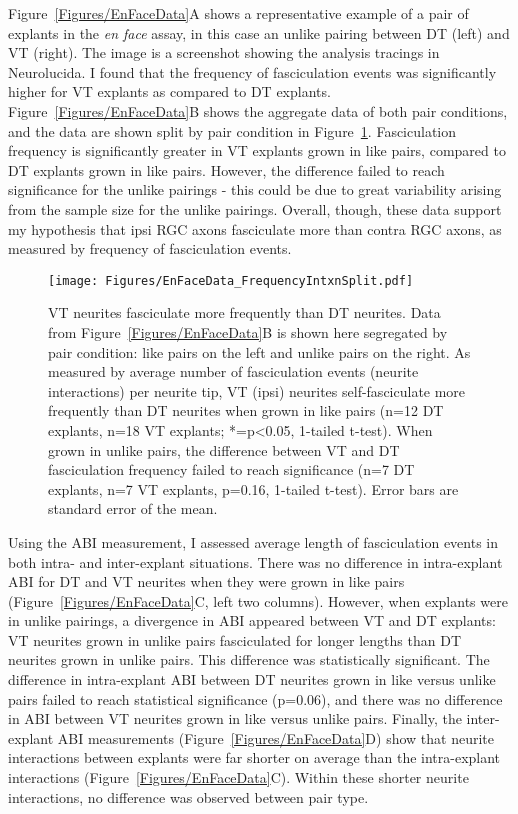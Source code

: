 Figure~\ref{Figures/EnFaceData}A shows a representative example of a pair of explants in the \emph{en face} assay, in this case an unlike pairing between DT (left) and VT (right).
The image is a screenshot showing the analysis tracings in Neurolucida.
I found that the frequency of fasciculation events was significantly higher for VT explants as compared to DT explants.
Figure~\ref{Figures/EnFaceData}B shows the aggregate data of both pair conditions, and the data are shown split by pair condition in Figure~\ref{Figures/EnFaceData_FrequencyIntxnSplit}.
Fasciculation frequency is significantly greater in VT explants grown in like pairs, compared to DT explants grown in like pairs.
However, the difference failed to reach significance for the unlike pairings - this could be due to great variability arising from the sample size for the unlike pairings.
Overall, though, these data support my hypothesis that ipsi RGC axons fasciculate more than contra RGC axons, as measured by frequency of fasciculation events.
\begin{figure}[hbtp]
    \begin{center}
        \texttt{[image: Figures/EnFaceData\_FrequencyIntxnSplit.pdf]}
        \caption[VT neurites fasciculate more frequently than DT neurites.]
        {
		VT neurites fasciculate more frequently than DT neurites.
		Data from Figure~\ref{Figures/EnFaceData}B is shown here segregated by pair condition: like pairs on the left and unlike pairs on the right.
		As measured by average number of fasciculation events (neurite interactions) per neurite tip, VT (ipsi) neurites self-fasciculate more frequently than DT neurites when grown in like pairs (n=12 DT explants, n=18 VT explants; *=p<0.05, 1-tailed t-test).
		When grown in unlike pairs, the difference between VT and DT fasciculation frequency failed to reach significance (n=7 DT explants, n=7 VT explants, p=0.16, 1-tailed t-test).
		Error bars are standard error of the mean.
		}
        \label{Figures/EnFaceData_FrequencyIntxnSplit}
    \end{center}
\end{figure}

Using the ABI measurement, I assessed average length of fasciculation events in both intra- and inter-explant situations.
There was no difference in intra-explant ABI for DT and VT neurites when they were grown in like pairs (Figure~\ref{Figures/EnFaceData}C, left two columns).
However, when explants were in unlike pairings, a divergence in ABI appeared between VT and DT explants: VT neurites grown in unlike pairs fasciculated for longer lengths than DT neurites grown in unlike pairs.
This difference was statistically significant.
The difference in intra-explant ABI between DT neurites grown in like versus unlike pairs failed to reach statistical significance (p=0.06), and there was no difference in ABI between VT neurites grown in like versus unlike pairs.
Finally, the inter-explant ABI measurements (Figure~\ref{Figures/EnFaceData}D) show that neurite interactions between explants were far shorter on average than the intra-explant interactions (Figure~\ref{Figures/EnFaceData}C).
Within these shorter neurite interactions, no difference was observed between pair type.

